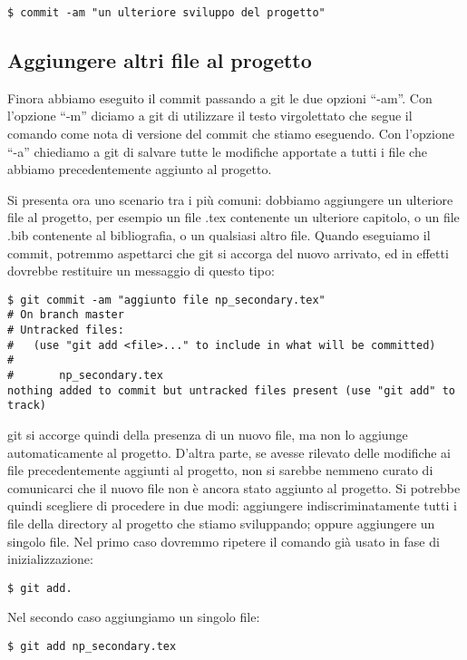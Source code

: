 \documentclass{article}
\begin{document}
\begin{lstlisting}
$ commit -am "un ulteriore sviluppo del progetto"
\end{lstlisting}

\subsection{Aggiungere altri file al progetto}
Finora abbiamo eseguito il commit passando a git le due opzioni ``-am''. Con
l'opzione ``-m'' diciamo a git di utilizzare il testo virgolettato che segue il
comando come nota di versione del commit che stiamo eseguendo. Con l'opzione
``-a'' chiediamo a git di salvare tutte le modifiche apportate a tutti i file
che abbiamo precedentemente aggiunto al progetto.

Si presenta ora uno scenario tra i più comuni: dobbiamo aggiungere un ulteriore
file al progetto, per esempio un file .tex contenente un ulteriore capitolo, o
un file .bib contenente al bibliografia, o un qualsiasi altro file.
Quando eseguiamo il commit, potremmo aspettarci che git si accorga del nuovo
arrivato, ed in effetti dovrebbe restituire un messaggio di questo tipo:

\begin{lstlisting}
$ git commit -am "aggiunto file np_secondary.tex"
# On branch master
# Untracked files:
#   (use "git add <file>..." to include in what will be committed)
#
#       np_secondary.tex
nothing added to commit but untracked files present (use "git add" to track)
\end{lstlisting}

git si accorge quindi della presenza di un nuovo file, ma non lo aggiunge
automaticamente al progetto. D'altra parte, se avesse rilevato delle modifiche
ai file precedentemente aggiunti al progetto, non si sarebbe nemmeno curato di
comunicarci che il nuovo file non è ancora stato aggiunto al progetto.
Si potrebbe quindi scegliere di procedere in due modi: aggiungere
indiscriminatamente tutti i file della directory al progetto che stiamo
sviluppando; oppure aggiungere un singolo file.
Nel primo caso dovremmo ripetere il comando già usato in fase di
inizializzazione:

\begin{lstlisting}
$ git add.
\end{lstlisting}

Nel secondo caso aggiungiamo un singolo file:

\begin{lstlisting}
$ git add np_secondary.tex
\end{lstlisting}
\end{document}
